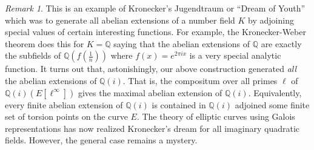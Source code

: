 \documentclass[12pt]{article}
\newcommand{\Q}{\mathbb{Q}}
\theoremstyle{remark}
\newtheorem*{remark}{Remark}
\theoremstyle{definition}
\begin{document}
\begin{remark}
This is an example of Kronecker's Jugendtraum or ``Dream of Youth'' which was to generate all abelian extensions of a number field $K$ by adjoining special values of certain interesting functions. For example, the Kronecker-Weber theorem does this for $K = \Q$ saying that the abelian extensions of $\Q$ are exactly the subfields of $\Q(f(\tfrac{1}{n}))$ where $f(x) = e^{2 \pi i x}$ is a very special analytic function. It turns out that, astonishingly, our above construction generated \textit{all} the abelian extensions of $\Q(i)$. That is, the compositum over all primes $\ell$ of $\Q(i)(E[\ell^\infty])$ gives the maximal abelian extension of $\Q(i)$. Equivalently, every finite abelian extension of $\Q(i)$ is contained in $\Q(i)$ adjoined some finite set of torsion points on the curve $E$. The theory of elliptic curves using Galois representations has now realized Kronecker's dream for all imaginary quadratic fields. However, the general case remains a mystery. 
\end{remark}
\end{document}
